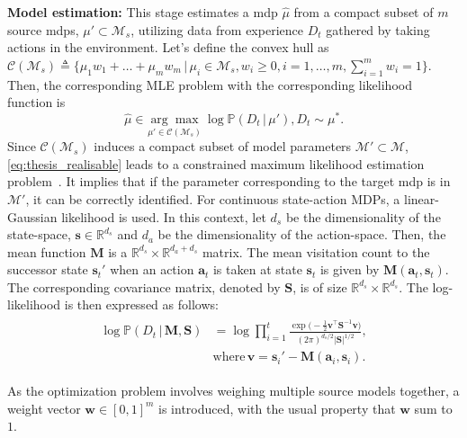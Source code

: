 \noindent\textbf{Model estimation:} This stage estimates a \gls{mdp} $\hat{\mu}$ from a compact subset of $m$ source \gls{mdp}s, $\mu' \subset \mathcal{M}_s$, utilizing data from experience $D_t$ gathered by taking actions in the environment.
Let's define the convex hull as $\mathcal{C}(\mathcal{M}_s) \triangleq \{\mu_1 w_1 + \hdots + \mu_m w_m \, | \, \mu_i \in \mathcal{M}_s, w_i \geq 0, i=1, \hdots, m, \sum_{i=1}^m w_i = 1\}$. Then, the corresponding MLE problem with the corresponding likelihood function is
\begin{equation}\label{eq:thesis_realisable}
    \hat{\mu} \in \underset{\mu' \in \mathcal{C}(\mathcal{M}_s)}{\arg\max} \, \log \mathbb{P}(D_t \, | \, \mu'), D_t \sim \mu^{*}.
\end{equation}
Since $\mathcal{C}(\mathcal{M}_s)$ induces a compact subset of model parameters $\mathcal{M}' \subset \mathcal{M}$, \eqref{eq:thesis_realisable} leads to a constrained maximum likelihood estimation problem~\citep{aitchison1958maximum}. It implies that if the parameter corresponding to the target \gls{mdp} is in $\mathcal{M}'$, it can be correctly identified.
For continuous state-action MDPs, a linear-Gaussian likelihood is used. In this context, let $d_s$ be the dimensionality of the state-space, $\bm{s} \in \mathbb{R}^{d_s}$ and $d_a$ be the dimensionality of the action-space. Then, the mean function $\mathbf{M}$ is a $\mathbb{R}^{d_s}\times\mathbb{R}^{d_a+d_s}$ matrix. The mean visitation count to the successor state $\bm{s}_t'$ when an action $\bm{a}_t$ is taken at state $\bm{s}_t$ is given by $\mathbf{M}(\bm{a}_t, \bm{s}_t)$. The corresponding covariance matrix, denoted by $\mathbf{S}$, is of size $\mathbb{R}^{d_s}\times\mathbb{R}^{d_s}$. The log-likelihood is then expressed as follows:
\begin{align*}
\begin{aligned}
    \log \mathbb{P}(D_t \, | \, \mathbf{M}, \mathbf{S}) &= \log \prod_{i=1}^t \frac{\exp\Big(-\frac{1}{2}\bm{v}^\top\mathbf{S}^{-1}\bm{v}\Big)}{(2\pi)^{d_s/2}|\mathbf{S}|^{1/2}},\\
    &\textrm{where} \,  \bm{v} = \bm{s}_i'-\mathbf{M}(\bm{a}_i, \bm{s}_i).
\end{aligned}
\end{align*}

As the optimization problem involves weighing multiple source models together, a weight vector $\bm{w} \in [0, 1]^{m}$ is introduced, with the usual property that $\bm{w}$ sum to $1$. 

